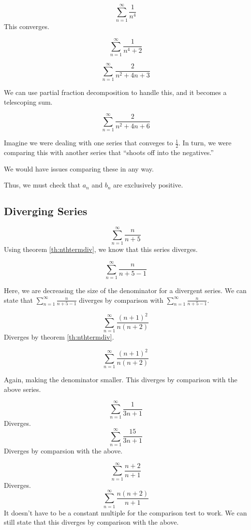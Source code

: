 \begin{ex}
  \[ \sum_{n=1}^{\infty} \frac{1}{n^4} \]
  This converges.

  \[ \sum_{n=1}^{\infty} \frac{1}{n^4+2} \]
\end{ex}
\begin{ex}
  \[ \sum_{n=1}^{\infty} \frac{2}{n^2+4n+3} \]
  \begin{note}
    We can use partial fraction decomposition to handle this, and it becomes a telescoping sum.
  \end{note}

  \[ \sum_{n=1}^{\infty} \frac{2}{n^2+4n+6} \]
\end{ex}

\begin{remark}
  Imagine we were dealing with one series that conveges to \( \frac{1}{2} \).
  In turn, we were comparing this with another series that ``shoots off into the negatives.''

  We would have issues comparing these in any way.

  Thus, we must check that \(a_n\) and \(b_n\) are exclusively positive.
\end{remark}

\subsection{Diverging Series}
\begin{ex}
  \[ \sum_{n=1}^{\infty} \frac{n}{n+5} \]
  Using theorem \ref{th:nthtermdiv}, we know that this series diverges.

  \[ \sum_{n=1}^{\infty} \frac{n}{n+5-1} \]

  Here, we are decreasing the size of the denominator for a divergent series.
  We can state that \( \sum_{n=1}^{\infty} \frac{n}{n+5-1} \) diverges by comparison with \( \sum_{n=1}^{\infty} \frac{n}{n+5-1} \).
\end{ex}
\begin{ex}
  \[ \sum_{n=1}^{\infty} \frac{(n+1)^2}{n(n+2)} \]
  Diverges by theorem \ref{th:nthtermdiv}.

  \[ \sum_{n=1}^{\infty} \frac{(n+1)^2}{n(n+2)} \]

  Again, making the denominator smaller. This diverges by comparison with the above series.
\end{ex}
\begin{ex}
  \[ \sum_{n=1}^{\infty} \frac{1}{3n+1} \]
  Diverges.
  \[ \sum_{n=1}^{\infty} \frac{15}{3n+1} \]
  Diverges by comparsion with the above.
\end{ex}
\begin{ex}
  \[ \sum_{n=1}^{\infty} \frac{n+2}{n+1} \]
  Diverges.
  \[ \sum_{n=1}^{\infty} \frac{n(n+2)}{n+1} \]
  It doesn't have to be a constant multiple for the comparison test to work.
  We can still state that this diverges by comparison with the above.
\end{ex}


